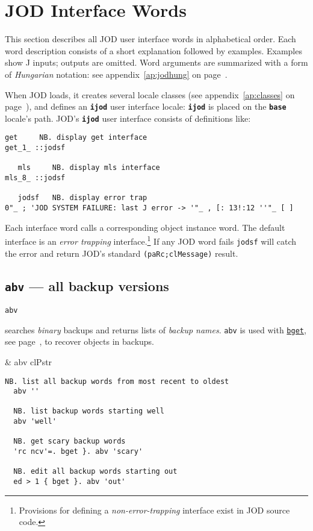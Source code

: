 \section{JOD Interface Words}\label{ss:jodwords}

This section describes all JOD user interface words in alphabetical
order.  Each  word description consists of a short explanation followed
by examples.  Examples show J inputs; outputs
are omitted.  Word arguments are summarized with a form of \emph{Hungarian}
notation: see appendix~\ref{ap:jodhung} on
page~\pageref{ap:jodhung}.

When JOD loads, it creates several locale classes (see appendix~\ref{ap:classes}
on page~\pageref{ap:classes}), and defines an \texttt{\textbf{ijod}} user 
interface locale: \texttt{\textbf{ijod}} 
is placed on the \texttt{\textbf{base}} locale's path.
JOD's \texttt{\textbf{ijod}} user interface consists of definitions like:  
\begin{lstlisting}[frame=single,framerule=0pt]
   get     NB. display get interface
get_1_ ::jodsf
    
   mls     NB. display mls interface
mls_8_ ::jodsf

   jodsf   NB. display error trap
0"_ ; 'JOD SYSTEM FAILURE: last J error -> '"_ , [: 13!:12 ''"_ [ ]   
\end{lstlisting}
Each interface word calls a corresponding object instance word.  The
default interface is an \emph{error trapping} interface.\footnote{Provisions
for defining a \emph{non-error-trapping} interface exist in JOD source code.}  If any JOD
word fails \texttt{jodsf} will catch the error and return JOD's standard \verb|(paRc;clMessage)|
result.


\subsection{\texttt{abv} --- all backup versions}\label{ss:abv} 

  \hypertarget{il:abv}{\texttt{abv}} searches \emph{binary} backups and returns lists
  of \emph{backup names}. \texttt{abv} is used with \hyperlink{il:bget}{\texttt{bget}}, see page~\pageref{ss:bget},
  to recover objects in backups.
  
    \begin{wordhead}
\monad & abv clPstr 
\end{wordhead}
\begin{lstlisting}[frame=single,framerule=0pt]
  NB. list all backup words from most recent to oldest
  abv ''

  NB. list backup words starting well
  abv 'well'
  
  NB. get scary backup words 
  'rc ncv'=. bget }. abv 'scary'
  
  NB. edit all backup words starting out
  ed > 1 { bget }. abv 'out' 
\end{lstlisting}

